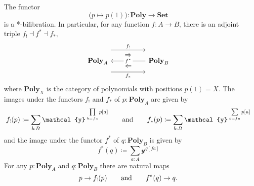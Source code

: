 \documentclass[11pt, one side, article]{memoir}
\theoremstyle{definition}
\theoremstyle{plain}
\newcommand{\Cat}[1]{\mathbf{#1}}%
\newcommand{\tn}[1]{\textnormal{#1}}
\newcommand{\smset}{\Cat{Set}}
\newcommand{\yon}{{\mathcal{y}}}
\newcommand{\poly}{\Cat{Poly}}
\newcommand{\0}{\textsf{0}}
\newcommand{\1}{\tn{\textsf{1}}}
\newcommand{\hh}[2][]{#1 \tn{#2} #1}
\newcommand{\qqand}{\hh[\qquad]{and}}
\begin{document}
The functor
\begin{equation}\label{eqn.bifib}
\big(p\mapsto p(1)\big)\colon\poly\to\smset
\end{equation}
is a *-bifibration. In particular, for any function $f\colon A\to B$, there is an adjoint triple $f_!\dashv f^*\dashv f_*$,
\begin{equation}
\begin{tikzcd}[column sep=50pt]
	\poly_A
		\ar[r, shift left=16pt, "f_!"]
		\ar[r, shift right=16pt, "f_*"']
		\ar[from=r, "f^*" description]
		\ar[r, phantom, shift left=8pt, "\Rightarrow"]
		\ar[r, phantom, shift right=8pt, "\Leftarrow"]
	&
	\poly_B
\end{tikzcd}
\end{equation}
where $\poly_X$ is the category of polynomials with positions $p(1)=X$. The images under the functors $f_!$ and $f_*$ of $p:\poly_A$ are given by
\begin{equation}
	f_!(p)\coloneqq\sum_{b: B}\yon^{\;\prod\limits_{b=fa}p[a]}
	\qqand
	f_*(p)\coloneqq\sum_{b: B}\yon^{\;\sum\limits_{b=fa}p[a]}
\end{equation}
and the image under the functor $f^*$ of $q:\poly_B$ is given by
\begin{equation}
	f^*(q)\coloneqq\sum_{a: A}\yon^{q[fa]}
\end{equation}
For any $p:\poly_A$ and $q:\poly_B$ there are natural maps
\begin{equation}
	p\to f_!(p)
	\qqand
	f^*(q)\to q.
\end{equation}
\end{document}
